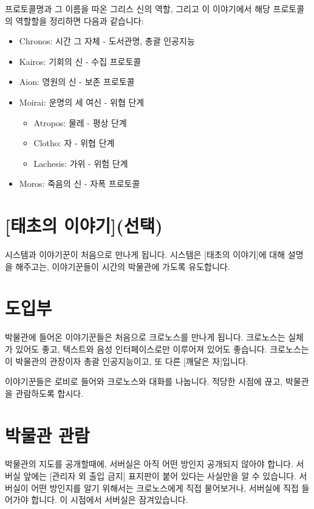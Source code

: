 \documentclass[12pt]{report}
\begin{document}
	\bigskip
	
	프로토콜명과 그 이름을 따온 그리스 신의 역할, 그리고 이 이야기에서 해당 프로토콜의 역할할을 정리하면 다음과 같습니다:
	
	\begin{itemize}
		\item Chronos: 시간 그 자체 - 도서관명, 총괄 인공지능
		\item Kairos: 기회의 신 - 수집 프로토콜
		\item Aion: 영원의 신 - 보존 프로토콜
		\item Moirai: 운명의 세 여신 - 위협 단계
		\begin{itemize}
			\item Atropos: 물레 - 평상 단계
			\item Clotho: 자 - 위협 단계
			\item Lachesis: 가위 - 위험 단계
		\end{itemize}
		\item Moros: 죽음의 신 - 자폭 프로토콜
	\end{itemize}
	
	\section*{[태초의 이야기](선택)}
		시스템과 이야기꾼이 처음으로 만나게 됩니다. 시스템은 [태초의 이야기]에 대해 설명을 해주고는, 이야기꾼들이 시간의 박물관에 가도록 유도합니다.
	
	\section*{도입부}
		박물관에 들어온 이야기꾼들은 처음으로 크로노스를 만나게 됩니다. 크로노스는 실체가 있어도 좋고, 텍스트와 음성 인터페이스로만 이루어져 있어도 좋습니다. 크로노스는 이 박물관의 관장이자 총괄 인공지능이고, 또 다른 [깨달은 자]입니다.
		
		이야기꾼들은 로비로 들어와 크로노스와 대화를 나눕니다. 적당한 시점에 끊고, 박물관을 관람하도록 합시다.
	
	\section*{박물관 관람}
		박물관의 지도를 공개할때에, 서버실은 아직 어떤 방인지 공개되지 않아야 합니다. 서버실 앞에는 [관리자 외 출입 금지] 표지판이 붙어 있다는 사실만을 알 수 있습니다. 서버실이 어떤 방인지를 알기 위해서는 크로노스에게 직접 물어보거나, 서버실에 직접 들어가야 합니다. 이 시점에서 서버실은 잠겨있습니다.
		
\end{document}
